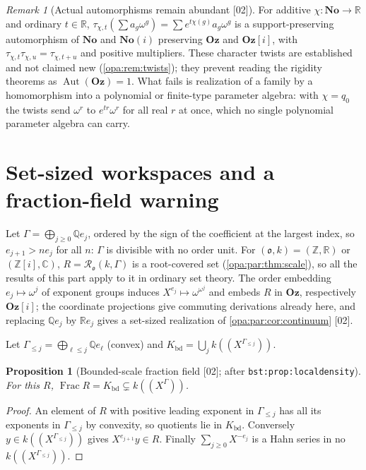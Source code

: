 \documentclass[11pt,oneside]{article}
\numberwithin{equation}{section}
\newtheorem{proposition}[proposition]{Proposition}
\theoremstyle{definition}
\theoremstyle{remark}
\newtheorem{remark}[remark]{Remark}
\newcommand{\No}{\mathbf{No}}
\newcommand{\Oz}{\mathbf{Oz}}
\newcommand{\Og}{\mathbf{Oz}[i]}
\newcommand{\SC}{\mathbf{No}(i)}
\newcommand{\R}{\mathbb R}
\newcommand{\C}{\mathbb C}
\newcommand{\Q}{\mathbb Q}
\newcommand{\Z}{\mathbb Z}
\newcommand{\oo}{\mathfrak o}
\newcommand{\Aut}{\operatorname{Aut}}
\newcommand{\Frac}{\operatorname{Frac}}
\newcommand{\src}[1]{\textup{\textsf{\small[#1]}}}
\newcommand{\lbl}[1]{\nolinkurl{#1}}
\begin{document}
\begin{remark}[Actual automorphisms remain abundant \src{02}]\label{opa:par:rem:actual}
For additive $\chi:\No\to\R$ and ordinary $t\in\R$,
$\tau_{\chi,t}(\sum a_g\omega^g)=\sum e^{t\chi(g)}a_g\omega^g$ is a support-preserving
automorphism of $\No$ and $\SC$ preserving $\Oz$ and $\Og$, with
$\tau_{\chi,t}\tau_{\chi,u}=\tau_{\chi,t+u}$ and positive multipliers. These character
twists are established \cite{KKS} and not claimed new (\cref{opa:rem:twists}); they
prevent reading the rigidity theorems as $\Aut(\Oz)=1$. What fails is realization of a
family by a homomorphism into a polynomial or finite-type parameter algebra: with
$\chi=q_0$ the twists send $\omega^r$ to $e^{tr}\omega^r$ for all real $r$ at once, which no
single polynomial parameter algebra can carry.
\end{remark}

\section{Set-sized workspaces and a fraction-field warning}\label{opa:par:sec:workspaces}

Let $\Gamma=\bigoplus_{j\ge0}\Q e_j$, ordered by the sign of the coefficient at the
largest index, so $e_{j+1}>ne_j$ for all $n$: $\Gamma$ is divisible with no order unit.
For $(\oo,k)=(\Z,\R)$ or $(\Z[i],\C)$, $R=\mathcal R_\oo(k,\Gamma)$ is a root-covered set
(\cref{opa:par:thm:scale}), so all the results of this part apply to it in ordinary set
theory. The order embedding $e_j\mapsto\omega^j$ of exponent groups induces
$X^{e_j}\mapsto\omega^{\omega^j}$ and embeds $R$ in $\Oz$, respectively $\Og$; the coordinate
projections give commuting derivations already here, and replacing $\Q e_j$ by $\R e_j$
gives a set-sized realization of \cref{opa:par:cor:continuum} \src{02}.

Let $\Gamma_{\le j}=\bigoplus_{\ell\le j}\Q e_\ell$ (convex) and
$K_{\mathrm{bd}}=\bigcup_jk((X^{\Gamma_{\le j}}))$.

\begin{proposition}[Bounded-scale fraction field \src{02}; after \lbl{bst:prop:localdensity}]\label{opa:par:prop:fracworkspace}
For this $R$, $\Frac R=K_{\mathrm{bd}}\subsetneq k((X^\Gamma))$.
\end{proposition}
\begin{proof}
An element of $R$ with positive leading exponent in $\Gamma_{\le j}$ has all its exponents
in $\Gamma_{\le j}$ by convexity, so quotients lie in $K_{\mathrm{bd}}$. Conversely
$y\in k((X^{\Gamma_{\le j}}))$ gives $X^{e_{j+1}}y\in R$. Finally $\sum_{j\ge0}X^{-e_j}$ is a Hahn
series in no $k((X^{\Gamma_{\le j}}))$.
\end{proof}
\end{document}
